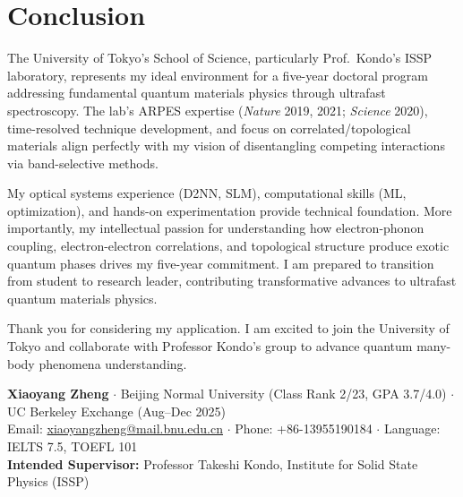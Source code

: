 \documentclass[11pt,a4paper]{article}
\begin{document}
\section{Conclusion}

The University of Tokyo's School of Science, particularly Prof.~Kondo's ISSP laboratory, represents my ideal environment for a five-year doctoral program addressing fundamental quantum materials physics through ultrafast spectroscopy. The lab's ARPES expertise (\textit{Nature} 2019, 2021; \textit{Science} 2020), time-resolved technique development, and focus on correlated/topological materials align perfectly with my vision of disentangling competing interactions via band-selective methods.

My optical systems experience (D2NN, SLM), computational skills (ML, optimization), and hands-on experimentation provide technical foundation. More importantly, my intellectual passion for understanding how electron-phonon coupling, electron-electron correlations, and topological structure produce exotic quantum phases drives my five-year commitment. I am prepared to transition from student to research leader, contributing transformative advances to ultrafast quantum materials physics.

Thank you for considering my application. I am excited to join the University of Tokyo and collaborate with Professor Kondo's group to advance quantum many-body phenomena understanding.

\vspace{0.5em}

\noindent
\textbf{Xiaoyang Zheng} $\cdot$ Beijing Normal University (Class Rank 2/23, GPA 3.7/4.0) $\cdot$ UC Berkeley Exchange (Aug--Dec 2025)\\
Email: \href{mailto:xiaoyangzheng@mail.bnu.edu.cn}{xiaoyangzheng@mail.bnu.edu.cn} $\cdot$ Phone: +86-13955190184 $\cdot$ Language: IELTS 7.5, TOEFL 101\\
\textbf{Intended Supervisor:} Professor Takeshi Kondo, Institute for Solid State Physics (ISSP)
\end{document}

